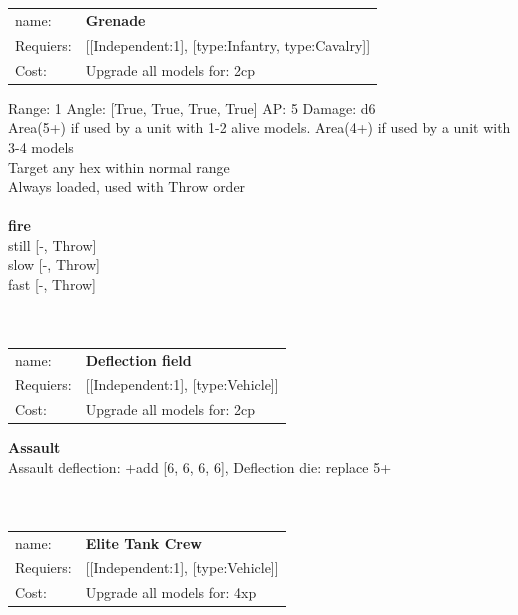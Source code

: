 \ \\
\ \\
\begin{tabular}{ll}
name: & {\bf Grenade } \\
Requiers: & [[Independent:1], [type:Infantry, type:Cavalry]] \\
Cost: & Upgrade all models for: 2cp \\
\end{tabular}



Range: 1  Angle: [True, True, True, True] AP: 5 Damage: d6 \\
Area(5+) if used by a unit with 1-2 alive models. Area(4+) if used by a unit with 3-4 models\\ 
Target any hex within normal range\\ 
Always loaded, used with Throw order\\ 







\ \\ {\bf fire } \\
still [-, Throw] \\
slow [-, Throw] \\
fast [-, Throw] \\

\ \\
\ \\
\begin{tabular}{ll}
name: & {\bf Deflection field } \\
Requiers: & [[Independent:1], [type:Vehicle]] \\
Cost: & Upgrade all models for: 2cp \\
\end{tabular}





{\bf Assault} \ \\
Assault deflection: +add [6, 6, 6, 6], Deflection die: replace 5+
\\ 




\ \\
\ \\
\begin{tabular}{ll}
name: & {\bf Elite Tank Crew } \\
Requiers: & [[Independent:1], [type:Vehicle]] \\
Cost: & Upgrade all models for: 4xp \\
\end{tabular}

